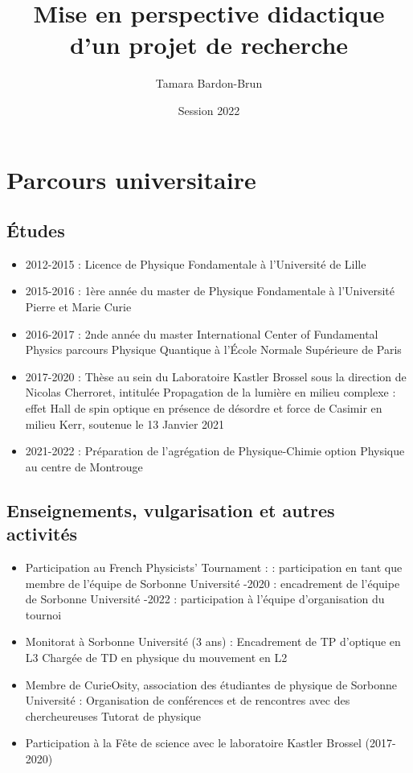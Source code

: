 \documentclass[a4paper,11pt]{article} %
\title{Mise en perspective didactique d'un projet de recherche}
\author{Tamara Bardon-Brun}
\date{Session 2022}
\newcommand{\pointmedian}{\fontfamily{cmr}\selectfont\textperiodcentered}
\begin{document}
	
	\maketitle
	
	\section{Parcours universitaire}
	\subsection{\'{E}tudes}
	\begin{itemize}
		\item 2012-2015 : Licence de Physique Fondamentale à l'Université de Lille
		\item 2015-2016 : 1ère année du master de Physique Fondamentale à l'Université Pierre et Marie Curie
		\item 2016-2017 : 2nde année du master International Center of Fundamental Physics parcours Physique Quantique à l'\'{E}cole Normale Supérieure de Paris
		\item 2017-2020 : Thèse au sein du Laboratoire Kastler Brossel sous la direction de Nicolas Cherroret, intitulée \og Propagation de la lumière en milieu complexe : effet Hall de spin optique en présence de désordre et force de Casimir en milieu Kerr\fg{}, soutenue le 13 Janvier 2021
		\item 2021-2022 : Préparation de l'agrégation de Physique-Chimie option Physique au centre de Montrouge
	\end{itemize}
	
	\subsection{Enseignements, vulgarisation et autres activités}
	\begin{itemize}
		\item Participation au French Physicists' Tournament :
		 : participation en tant que membre de l'équipe de Sorbonne Université
		-2020 : encadrement de l'équipe de Sorbonne Université
		-2022 : participation à l'équipe d'organisation du tournoi \\
		\item Monitorat à Sorbonne Université (3 ans) :
		\subitem Encadrement de TP d'optique en L3
		\subitem Chargée de TD en physique du mouvement en L2 \\
		\item Membre de CurieOsity, association des étudiant\pointmedian es de physique de Sorbonne Université :
		\subitem Organisation de conférences et de rencontres avec des chercheur\pointmedian euses
		\subitem Tutorat de physique\\
		\item Participation à la Fête de science avec le laboratoire Kastler Brossel (2017-2020)
	\end{itemize}
\end{document}
